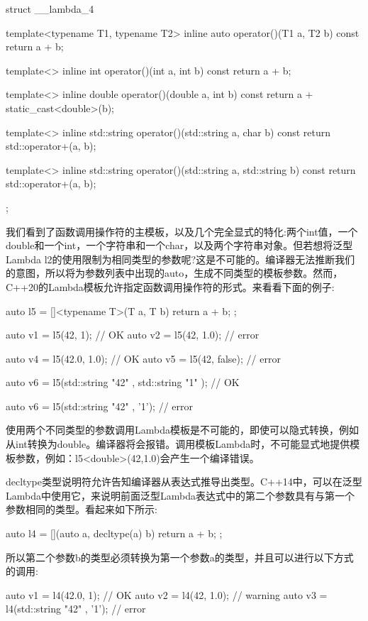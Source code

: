 \begin{cpp}
struct __lambda_4
{
	template<typename T1, typename T2>
	inline auto operator()(T1 a, T2 b) const
	{
		return a + b;
	}

	template<>
	inline int operator()(int a, int b) const
	{
		return a + b;
	}

	template<>
	inline double operator()(double a, int b) const
	{
		return a + static_cast<double>(b);
	}

	template<>
	inline std::string operator()(std::string a,
	char b) const
	{
		return std::operator+(a, b);
	}

	template<>
	inline std::string operator()(std::string a,
	std::string b) const
	{
		return std::operator+(a, b);
	}
};
\end{cpp}

我们看到了函数调用操作符的主模板，以及几个完全显式的特化:两个int值，一个double和一个int，一个字符串和一个char，以及两个字符串对象。但若想将泛型Lambda l2的使用限制为相同类型的参数呢?这是不可能的。编译器无法推断我们的意图，所以将为参数列表中出现的auto，生成不同类型的模板参数。然而，C++20的Lambda模板允许指定函数调用操作符的形式。来看看下面的例子:

\begin{cpp}
auto l5 = []<typename T>(T a, T b) { return a + b; };

auto v1 = l5(42, 1); // OK
auto v2 = l5(42, 1.0); // error

auto v4 = l5(42.0, 1.0); // OK
auto v5 = l5(42, false); // error

auto v6 = l5(std::string{ "42" }, std::string{ "1" }); // OK

auto v6 = l5(std::string{ "42" }, '1'); // error
\end{cpp}

使用两个不同类型的参数调用Lambda模板是不可能的，即使可以隐式转换，例如从int转换为double。编译器将会报错。调用模板Lambda时，不可能显式地提供模板参数，例如：l5<double>(42,1.0)会产生一个编译错误。

decltype类型说明符允许告知编译器从表达式推导出类型。C++14中，可以在泛型Lambda中使用它，来说明前面泛型Lambda表达式中的第二个参数具有与第一个参数相同的类型。看起来如下所示:

\begin{cpp}
auto l4 = [](auto a, decltype(a) b) {return a + b; };
\end{cpp}

所以第二个参数b的类型必须转换为第一个参数a的类型，并且可以进行以下方式的调用:

\begin{cpp}
auto v1 = l4(42.0, 1); // OK
auto v2 = l4(42, 1.0); // warning
auto v3 = l4(std::string{ "42" }, '1'); // error
\end{cpp}

